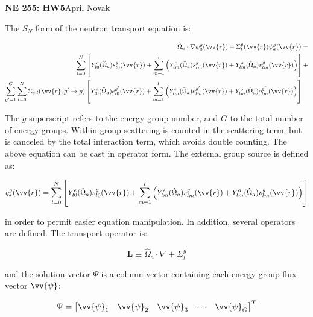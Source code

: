 \documentclass[10pt]{article}
\newcommand*\circled[1]{\tikz[baseline=(char.base)]{
            \node[shape=circle,draw,inner sep=2pt] (char) {#1};}}
\begin{document}
\textbf{NE 255: HW5}\hfill April Novak\newline

\circled{1} The \(S_N\) form of the neutron transport equation is:

\begin{equation}
\label{eq:StartofOperatorForm}
\begin{aligned}
 \hat{\Omega}_a\cdot\nabla\psi_a^g(\vv{r}) + 
 \Sigma_t^g(\vv{r})\psi_a^g(\vv{r}) = \\
\sum_{l=0}^{N}\left\lbrack Y_{l0}^e(\hat{\Omega}_a)s_{l0}^g(\vv{r})+\sum_{m=1}^{l}\left(Y_{lm}^e(\hat{\Omega}_a)s_{lm}^g(\vv{r})+Y_{lm}^o(\hat{\Omega}_a)v_{lm}^g(\vv{r})\right)\right\rbrack+\\
\sum_{g'=1}^G\sum_{l=0}^{N}\Sigma_{s,l}(\vv{r}, g'\rightarrow g)\left\lbrack Y_{l0}^e(\hat{\Omega}_a)e_{l0}^{g'}(\vv{r})+\sum_{m=1}^{l}\left(Y_{lm}^e(\hat{\Omega}_a)e_{lm}^{g'}(\vv{r})+Y_{lm}^o(\hat{\Omega}_a)o_{lm}^{g'}(\vv{r})\right)\right\rbrack\quad\\
\end{aligned}
\end{equation}

The \(g\) superscript refers to the energy group number, and \(G\) to the total number of energy groups. Within-group scattering is counted in the scattering term, but is canceled by the total interaction term, which avoids double counting. The above equation can be cast in operator form. The external group source is defined as:

\begin{equation}
q_e^g(\vv{r})=\sum_{l=0}^{N}\left\lbrack Y_{l0}^e(\hat{\Omega}_a)s_{l0}^g(\vv{r})+\sum_{m=1}^{l}\left(Y_{lm}^e(\hat{\Omega}_a)s_{lm}^g(\vv{r})+Y_{lm}^o(\hat{\Omega}_a)v_{lm}^g(\vv{r})\right)\right\rbrack
\end{equation}

in order to permit easier equation manipulation. In addition, several operators are defined. The transport operator is:

\begin{equation}
\textbf{L}\equiv\hat{\Omega}_a\cdot\nabla+\Sigma_t^g
\end{equation}

and the solution vector \(\Psi\) is a column vector containing each energy group flux vector \(\vv{\psi}\):

\begin{equation}
\Psi=\begin{bmatrix}\vv{\psi}_1&\vv{\psi}_2&\vv{\psi}_3&\cdots&\vv{\psi}_G\end{bmatrix}^T
\end{equation}
\end{document}
